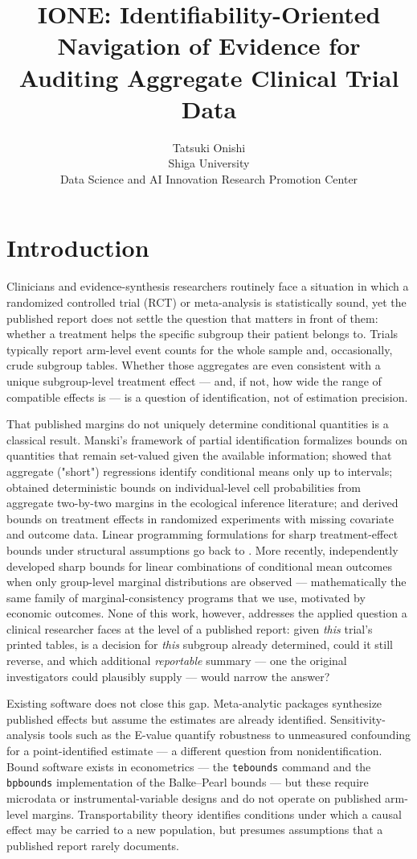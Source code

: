 \documentclass[article]{ajs}
\author{Tatsuki Onishi\\ Shiga University\\ Data Science and AI Innovation
        Research Promotion Center}
\title{IONE: Identifiability-Oriented Navigation of Evidence for Auditing
Aggregate Clinical Trial Data}
\begin{document}
\section{Introduction}
\label{sec:intro}

Clinicians and evidence-synthesis researchers routinely face a situation
in which a randomized controlled trial (RCT) or meta-analysis is
statistically sound, yet the published report does not settle the
question that matters in front of them: whether a treatment helps the
specific subgroup their patient belongs to. Trials typically report
arm-level event counts for the whole sample and, occasionally, crude
subgroup tables. Whether those aggregates are even consistent with a
unique subgroup-level treatment effect --- and, if not, how wide the
range of compatible effects is --- is a question of identification, not
of estimation precision.

That published margins do not uniquely determine conditional quantities
is a classical result. Manski's framework of partial identification
\citep{manski2003} formalizes bounds on quantities that remain set-valued
given the available information; \citet{cross2002} showed that aggregate
("short") regressions identify conditional means only up to intervals;
\citet{king1997} obtained deterministic bounds on individual-level
cell probabilities from aggregate two-by-two margins in the ecological
inference literature; and \citet{horowitz2000} derived bounds on
treatment effects in randomized experiments with missing covariate and
outcome data. Linear programming formulations for sharp treatment-effect
bounds under structural assumptions go back to \citet{balke1997}. More
recently, \citet{moon2026} independently developed sharp bounds for
linear combinations of conditional mean outcomes when only group-level
marginal distributions are observed --- mathematically the same family of
marginal-consistency programs that we use, motivated by economic
outcomes. None of this work, however, addresses the applied question a
clinical researcher faces at the level of a published report: given
\emph{this} trial's printed tables, is a decision for \emph{this}
subgroup already determined, could it still reverse, and which
additional \emph{reportable} summary --- one the original investigators
could plausibly supply --- would narrow the answer?

Existing software does not close this gap. Meta-analytic packages
\citep{viechtbauer2010} synthesize published effects but assume the
estimates are already identified. Sensitivity-analysis tools such as the
E-value \citep{vanderweele2017} quantify robustness to unmeasured
confounding for a point-identified estimate --- a different question from
nonidentification. Bound software exists in econometrics --- the
\texttt{tebounds} command \citep{mccarthy2015} and the
\texttt{bpbounds} implementation of the Balke--Pearl bounds
\citep{palmer2011} --- but these require microdata or instrumental-variable
designs and do not operate on published arm-level margins. Transportability
theory \citep{pearlbareinboim2014} identifies conditions under which a
causal effect may be carried to a new population, but presumes assumptions
that a published report rarely documents.
\end{document}
